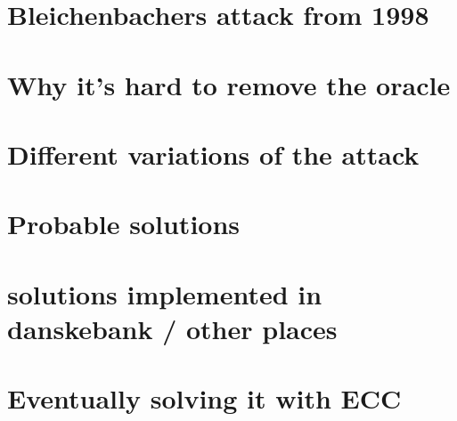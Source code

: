 \documentclass[a4paper,12pt]{report}
\begin{document}
\section{Bleichenbachers attack from 1998}
\section{Why it's hard to remove the oracle}
\section{Different variations of the attack}
\section{Probable solutions}
\section{solutions implemented in danskebank / other places}
\section{Eventually solving it with ECC}

{} %

\end{document}
